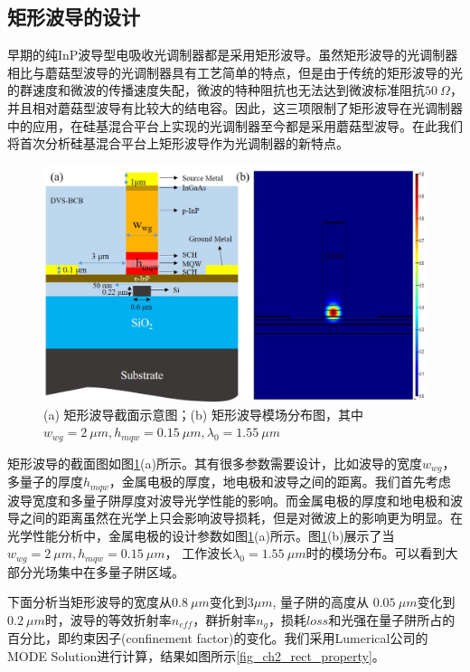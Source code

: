 \subsection{矩形波导的设计}
早期的纯InP波导型电吸收光调制器都是采用矩形波导\cite{zhang1999traveling,Robertphd,yuphd}。虽然矩形波导的光调制器相比与蘑菇型波导的光调制器具有工艺简单的特点\cite{chiu2005enhanced}，但是由于传统的矩形波导的光的群速度和微波的传播速度失配，微波的特种阻抗也无法达到微波标准阻抗$50 ~\Omega$，并且相对蘑菇型波导有比较大的结电容。因此，这三项限制了矩形波导在光调制器中的应用，在硅基混合平台上实现的光调制器至今都是采用蘑菇型波导\cite{kuo2008high, tang201150, tang2012over, tang2012energy, chen2011forty}。在此我们将首次分析硅基混合平台上矩形波导作为光调制器的新特点。
\begin{figure}[htb]
	\centering
	\includegraphics[width=12cm]{./Pictures/fig_ch2_rect_structure_mode.jpg}
	\caption{(a) 矩形波导截面示意图；(b) 矩形波导模场分布图，其中$w_{wg} = 2~ \mu m, h_{mqw} = 0.15 ~\mu m, \lambda_0 = 1.55~\mu m$}
	\label{fig_ch2_rect_structure_mode}
\end{figure}

矩形波导的截面图如图\ref{fig_ch2_rect_structure_mode}(a)所示。其有很多参数需要设计，比如波导的宽度$w_{wg}$，多量子的厚度$h_{mqw}$，金属电极的厚度，地电极和波导之间的距离。我们首先考虑波导宽度和多量子阱厚度对波导光学性能的影响。而金属电极的厚度和地电极和波导之间的距离虽然在光学上只会影响波导损耗，但是对微波上的影响更为明显。在光学性能分析中，金属电极的设计参数如图\ref{fig_ch2_rect_structure_mode}(a)所示。图\ref{fig_ch2_rect_structure_mode}(b)展示了当$w_{wg} = 2 ~\mu m, h_{mqw} = 0.15 ~\mu m$， 工作波长$\lambda_0 = 1.55~\mu m$时的模场分布。可以看到大部分光场集中在多量子阱区域。


下面分析当矩形波导的宽度从$0.8 ~\mu m$变化到$3 \mu m$, 量子阱的高度从 $0.05 ~\mu m$变化到$0.2 ~\mu m$时，波导的等效折射率$n_{eff}$，群折射率$n_g$，损耗$loss$和光强在量子阱所占的百分比，即约束因子(confinement factor)的变化。我们采用Lumerical公司的MODE Solution进行计算\cite{modesolution}，结果如图所示\ref{fig_ch2_rect_property}。


